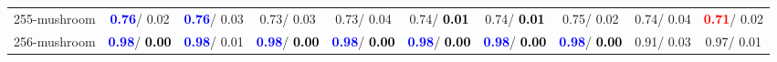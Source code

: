 \begin{table}[h]
\begin{center}
{\begin{tabular}{lc|c|c|c|c|c|c|c|c}
255-mushroom & \textcolor{blue}{\textbf{  0.76}}/  0.02 & \textcolor{blue}{\textbf{  0.76}}/  0.03 &   0.73/  0.03 &   0.73/  0.04 &   0.74/\textcolor{black}{\textbf{  0.01}} &   0.74/\textcolor{black}{\textbf{  0.01}} &   0.75/  0.02 &   0.74/  0.04 & \textcolor{red}{\textbf{  0.71}}/  0.02 \\
256-mushroom & \textcolor{blue}{\textbf{  0.98}}/\textcolor{black}{\textbf{  0.00}} & \textcolor{blue}{\textbf{  0.98}}/  0.01 & \textcolor{blue}{\textbf{  0.98}}/\textcolor{black}{\textbf{  0.00}} & \textcolor{blue}{\textbf{  0.98}}/\textcolor{black}{\textbf{  0.00}} & \textcolor{blue}{\textbf{  0.98}}/\textcolor{black}{\textbf{  0.00}} & \textcolor{blue}{\textbf{  0.98}}/\textcolor{black}{\textbf{  0.00}} & \textcolor{blue}{\textbf{  0.98}}/\textcolor{black}{\textbf{  0.00}} &   0.91/  0.03 &   0.97/  0.01 \\\end{tabular}}\label{stratsALCKappa7Allallb}
\end{center}
\end{table}
